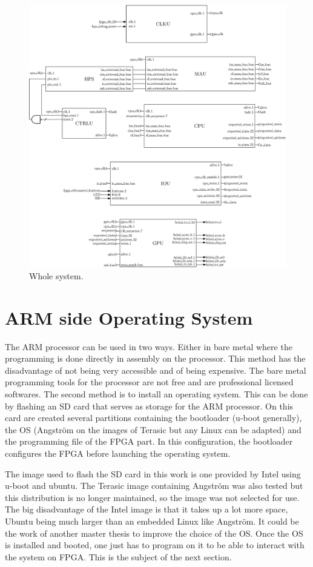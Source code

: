 \begin{figure}[H]
    \centering
    \includegraphics[width=\linewidth]{Chapter6-System/res/system.eps}
    \caption{Whole system.}
    \label{fig:system/system}
\end{figure}

\section{ARM side Operating System}

The ARM processor can be used in two ways. Either in bare metal where the programming is done 
directly in assembly on the processor. This method has the disadvantage of not being very 
accessible and of being expensive. The bare metal programming tools for the processor are not 
free and are professional licensed softwares. The second method is to install an operating system. 
This can be done by flashing an SD card that serves as storage for the ARM processor. On this card 
are created several partitions containing the bootloader (u-boot generally), the OS (Angström on 
the images of Terasic but any Linux can be adapted) and the programming file of the FPGA part. In 
this configuration, the bootloader configures the FPGA before launching the operating system. 

The image used to flash the SD card in this work is one provided by Intel using u-boot and ubuntu. The 
Terasic image containing Angström was also tested but this distribution is no longer maintained, so 
the image was not selected for use. The big disadvantage of the Intel image is that it takes up a 
lot more space, Ubuntu being much larger than an embedded Linux like Angström. It could be the work of 
another master thesis to improve the choice of the OS. Once the OS is installed and booted, one just 
has to program on it to be able to interact with the system on FPGA. This is the subject of the next 
section.
